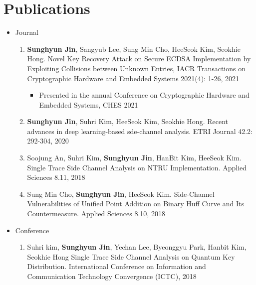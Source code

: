 \documentclass[a4paper,20pt]{article}
\begin{document}
\section{\textbf{Publications}}
\begin{itemize}
    \item {Journal}
        \vspace{-6pt}
        \begin{enumerate}
            \item {\textbf{Sunghyun Jin}, Sangyub Lee, Sung Min Cho, HeeSeok Kim, Seokhie Hong. Novel Key Recovery Attack on Secure ECDSA Implementation by Exploiting Collisions between Unknown Entries, IACR Transactions on Cryptographic Hardware and Embedded Systems 2021(4): 1-26, 2021}
            \vspace{-2pt}
            \begin{itemize}
                \item {Presented in the annual Conference on Cryptographic Hardware and Embedded Systems, CHES 2021}
            \end{itemize}
            \vspace{-2pt}
            \item {\textbf{Sunghyun Jin}, Suhri Kim, HeeSeok Kim, Seokhie Hong. Recent advances in deep learning-based sde-channel analysis. ETRI Journal 42.2: 292-304, 2020}
            \vspace{-2pt}
            \item {Soojung An, Suhri Kim, \textbf{Sunghyun Jin}, HanBit Kim, HeeSeok Kim. Single Trace Side Channel Analysis on NTRU Implementation. Applied Sciences 8.11, 2018}
            \vspace{-2pt}
            \item {Sung Min Cho, \textbf{Sunghyun Jin}, HeeSeok Kim. Side-Channel Vulnerabilities of Unified Point Addition on Binary Huff Curve and Its Countermeasure. Applied Sciences 8.10, 2018}
            \vspace{-2pt}
        \end{enumerate}
    \item {Conference}
        \vspace{-6pt}
        \begin{enumerate}
            \item {Suhri kim, \textbf{Sunghyun Jin}, Yechan Lee, Byeonggyu Park, Hanbit Kim, Seokhie Hong Single Trace Side Channel Analysis on Quantum Key Distribution. International Conference on Information and Communication Technology Convergence (ICTC), 2018}

\end{enumerate}
\end{itemize}
\end{document}
